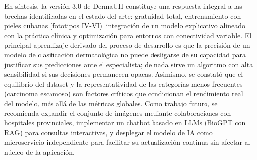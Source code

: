 \begin{conclusions}
En síntesis, la versión 3.0 de DermaUH constituye una respuesta integral a las brechas 
identificadas en el estado del arte: gratuidad total, entrenamiento con pieles cubanas 
(fototipos IV-VI), integración de un modelo explicativo alineado con la práctica clínica 
y optimización para entornos con conectividad variable. El principal aprendizaje derivado
del proceso de desarrollo es que la precisión de un modelo de clasificación dermatológica 
no puede desligarse de su capacidad para justificar sus predicciones ante el especialista; 
de nada sirve un algoritmo con alta sensibilidad si sus decisiones permanecen opacas. 
Asimismo, se constató que el equilibrio del dataset y la representatividad de las 
categorías menos frecuentes (carcinoma escamoso) son factores críticos que condicionan el 
rendimiento real del modelo, más allá de las métricas globales. Como trabajo futuro, se 
recomienda expandir el conjunto de imágenes mediante colaboraciones con hospitales 
provinciales, implementar un chatbot basado en LLMs (BioGPT con RAG) para consultas 
interactivas, y desplegar el modelo de IA como microservicio independiente para facilitar 
su actualización continua sin afectar al núcleo de la aplicación.
\end{conclusions}

